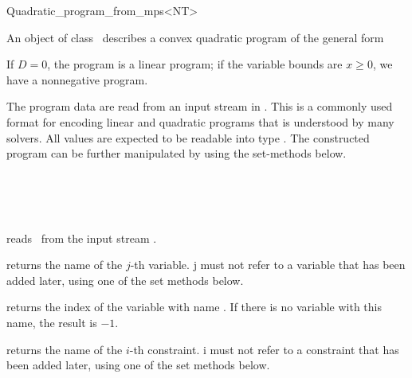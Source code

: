 \begin{ccRefClass}{Quadratic_program_from_mps<NT>}


\ccDefinition
An object of class \ccRefName\ describes a convex quadratic program of the 
general form



If $D=0$, the program is
a linear program; if the variable bounds are $x\geq 0$, we have a 
nonnegative program.

The program data are read from an input stream in . This is
a commonly used format for encoding linear and quadratic programs that
is understood by many solvers. All values are expected to be readable
into type . The constructed program can be further manipulated 
by using the set-methods below.

\ccIsModel
{}\\
\\
\\

\ccTypes
{}

\ccCreation
\ccIndexClassCreation
{}

{reads \ccVar\ from the input stream .}

\ccOperations



{returns the name of the $j$-th variable. \ccPrecond j must not refer 
 to a variable that has been added later, using one of the set methods 
 below.}

{returns the index of the variable with name . If there is
no variable with this name, the result is $-1$.}

{returns the name of the $i$-th constraint. \ccPrecond i must not refer 
 to a constraint that has been added later, using one of the set methods 
 below.}


\end{ccRefClass}
